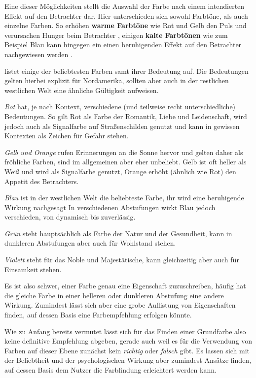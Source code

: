 Eine dieser Möglichkeiten stellt die Auswahl der Farbe nach einem intendierten Effekt auf den Betrachter dar.
Hier unterschieden sich sowohl Farbtöne, als auch einzelne Farben.
So erhöhen \textbf{warme Farbtöne} wie Rot und Gelb den Puls und verursachen Hunger beim Betrachter \cite{berman2010street},
einigen \textbf{kalte Farbtönen} wie zum Beispiel Blau kann hingegen ein einen beruhigenden Effekt auf den Betrachter nachgewiesen werden \cite{crozier1999meanings}.

\cite{berman2010street} listet einige der beliebtesten Farben samt ihrer Bedeutung auf. Die Bedeutungen gelten hierbei explizit für Nordamerika, sollten aber auch in der restlichen westlichen Welt eine ähnliche Gültigkeit aufweisen.

\textit{Rot} hat, je nach Kontext, verschiedene (und teilweise recht unterschiedliche) Bedeutungen. So gilt Rot als Farbe der Romantik, Liebe und Leidenschaft, wird jedoch auch als Signalfarbe auf Straßenschilden genutzt und kann in gewissen Kontexten als Zeichen für Gefahr stehen.

\textit{Gelb und Orange} rufen Erinnerungen an die Sonne hervor und gelten daher als fröhliche Farben, sind im allgemeinen aber eher unbeliebt. Gelb ist oft heller als Weiß und wird als Signalfarbe genutzt, Orange erhöht (ähnlich wie Rot) den Appetit des Betrachters.

\textit{Blau} ist in der westlichen Welt die beliebteste Farbe, ihr wird eine beruhigende Wirkung nachgesagt In verschiedenen Abstufungen wirkt Blau jedoch verschieden, von dynamisch bis zuverlässig.

\textit{Grün} steht hauptsächlich als Farbe der Natur und der Gesundheit, kann in dunkleren Abstufungen aber auch für Wohlstand stehen.

\textit{Violett} steht für das Noble und Majestätische, kann gleichzeitig aber auch für Einsamkeit stehen.

Es ist also schwer, einer Farbe genau eine Eigenschaft zuzuschreiben, häufig hat die gleiche Farbe in einer helleren oder dunkleren Abstufung eine andere Wirkung. Zumindest lässt sich aber eine grobe Auflistung von Eigenschaften finden, auf dessen Basis eine Farbempfehlung erfolgen könnte.

Wie zu Anfang bereits vermutet lässt sich für das Finden einer Grundfarbe also keine definitive Empfehlung abgeben, gerade auch weil es für die Verwendung von Farben auf dieser Ebene zunächst kein \textit{richtig} oder \textit{falsch} gibt. Es lassen sich mit der Beliebtheit und der psychologischen Wirkung aber zumindest Ansätze finden, auf dessen Basis dem Nutzer die Farbfindung erleichtert werden kann.

